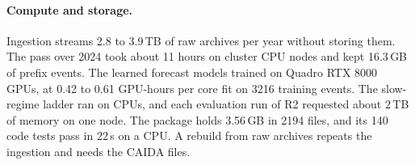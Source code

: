 \paragraph{Compute and storage.}
Ingestion streams 2.8 to 3.9\,TB of raw archives per year without storing them.
The pass over 2024 took about 11 hours on cluster CPU nodes and kept 16.3\,GB of prefix events.
The learned forecast models trained on Quadro RTX 8000 GPUs, at 0.42 to 0.61 GPU-hours per core fit on \num{3216} training events.
The slow-regime ladder ran on CPUs, and each evaluation run of R2 requested about 2\,TB of memory on one node.
The package holds 3.56\,GB in \num{2194} files, and its 140 code tests pass in 22\,s on a CPU.
A rebuild from raw archives repeats the ingestion and needs the CAIDA files.

